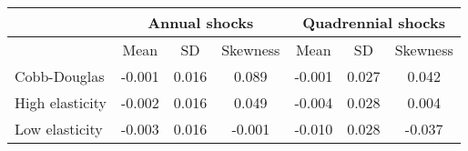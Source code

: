 
\begin{tabular}{lcccccc}
\toprule
& \multicolumn{3}{c}{Annual shocks} & \multicolumn{3}{c}{Quadrennial shocks} \\

\toprule
 & Mean & SD & Skewness & Mean & SD & Skewness \\
\midrule
Cobb-Douglas & -0.001 & 0.016 & 0.089 & -0.001 & 0.027 & 0.042 \\
High elasticity & -0.002 & 0.016 & 0.049 & -0.004 & 0.028 & 0.004 \\
Low elasticity & -0.003 & 0.016 & -0.001 & -0.010 & 0.028 & -0.037 \\
\bottomrule
\end{tabular}
